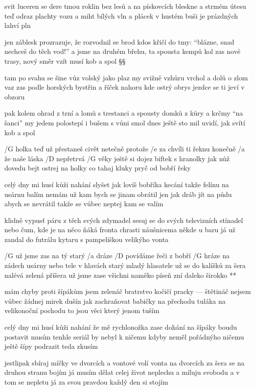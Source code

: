 svit luceren se dere tmou roklin bez lesů
a na pískovcích bleskne a strmém útesu
teď odraz plachty vozu a miht bílých vln
a plácek v hustém buši je prázdných lahví pln \s

jen záblesk prozrazuje, že rozvodnil se brod
kdos křičí do tmy: ``blázne, snad nechceš do těch vod!''
a jsme na druhém břehu, ta spousta kempů kol
zas nové trasy, nový směr vzít musí kob a spol \S\S


tam po svahu se šine vůz volský jako plaz
my svižně vzhůru vrchol a dolů o zlom vaz
zas podle horských bystřin a říček nahoru
kde ostrý obrys jezdce se ti jeví v obzoru \s

pak kolem ohrad z trní a lomů s trestanci
a spousty domků z kůry a krčmy ``na šanci''
my jedem polostepí i bušem s vůni smol
dnes ještě sto mil uvidí, jak svítí kob a spol




/G holka teď už přestaneš civět netečně
protože /e za chvíli ti řeknu konečně
/a že naše láska /D nepřetrvá /G věky \s
ještě si dojez biftek s hranolky
jak nůž dovedu bejt ostrej na holky
co tahaj kluky pryč od bobří řeky \s

celý dny mi husí kůži nahání
slyšet jak lovíš bobříka kecání
takže felínu na usárnu balím
nemám už kam bych se jinam obrátil
jen jak dráb jít na půdu abych se nevrátil
takže se vůbec neptej kam se valím \s

klidně vypusť páru z těch svých zdymadel
sesuj se do svých televizních stínadel
nebo čum, kde je na něco ňáká fronta
chrasti náušnicema někde u baru
já už zandal do futrálu kytaru
s pampeliškou velikýho vonta \s

\R /G už jsme zas na tý starý /a dráze
   /D povídáme řeči z bobří /G hráze
   na zádech usárny nebo tele
   v hlavách starý mladý hlasatele
   už se do kalíšků za šera
   nalévá zelená příšera
   už jsme zase všichni naměko
   píseň zní daleko širokko **

mám chyby proti šípákům jsem zelenáč
bratrstvo kočičí pracky --- štětináč
nejsem vůbec žádnej mirek dušín
jak zachraňovat babičky na přechodu
tuláka na velikonoční pochodu
to jsou věci který jenom tuším \songgg

celý dny mi husí kůži nahání
že mě rychlonožka zase dohání
na šípáky boudu postavit musím
tenhle seriál by nebyl k ničemu
kdyby neměl pořádnýho ničemu
ještě šípy podrazit teda zkusím \s

jestlipak sbíraj míčky ve dvorcích
a vontové volí vonta na dvorcích
za šera se na druhou stranu bojím
já musím dělat celej život neplechu
a miluju svobodu a v tom se nepletu
já za svou pravdou každý den si stojím \s

